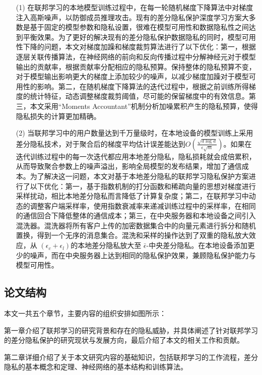 \begin{enumerate}
\item [(1)]在联邦学习的本地模型训练过程中，在每一轮随机梯度下降算法中对梯度注入高斯噪声，以防御成员推理攻击。现有的差分隐私保护深度学习方案大多数是基于固定的模型参数和隐私设置，很难在模型可用性和数据隐私性之间达到平衡效果。为了更好的解决现有的差分隐私保护数据隐私的同时，模型可用性下降的问题，本文对梯度加躁和梯度裁剪算法进行了以下优化：第一，根据逐层关联传播算法，在神经网络的前向和反向传播过程中分解神经元对于模型输出的贡献率，根据贡献率分配相应的隐私预算。保持整体的隐私预算不变，对于模型输出影响更大的梯度上添加较少的噪声，以减少梯度加躁对于模型可用性的影响。第二，在随机梯度下降算法的迭代过程中，根据之前训练所得梯度的统计特征，动态调整梯度裁剪阈值，尽可能的保留梯度中的有效信息。第三，本文采用“Moments Accountant”机制分析加噪累积产生的隐私预算，使得隐私损失的计算更加精确。

\item [(2)]当联邦学习中的用户数量达到千万量级时，在本地设备的模型训练上采用差分隐私技术，对于聚合后的梯度平均估计误差能达到$O\left(\frac{\sqrt{d \log d}}{\epsilon \sqrt{m}}\right)$。如果在迭代训练过程中的每一次迭代都应用本地差分隐私，隐私损耗就会成倍累积，从而导致聚合参数上的噪声溢出，影响全局模型的发布结果，增加了通信成本。为了解决这一问题，本文对基于本地差分隐私的联邦学习隐私保护方案进行了以下优化：第一，基于指数机制的打分函数和稀疏向量的思想对梯度进行采样扰动，相比本地差分隐私而言降低了计算复杂度；第二，在联邦学习中动态的调整客户端采样率，使用指数衰减率来递减训练过程中的采样率，在相同的通信回合下降低整体的通信成本；第三，在中央服务器和本地设备之间引入混洗器。混洗器将所有客户上传的加密数据集合中的向量元素进行拆分和随机置换，得到一个无序的消息集合。混洗和采样的操作达到了双重的隐私放大效应，从 $\left(\epsilon_{c}+\epsilon_{l}\right)$的本地差分隐私放大至 $\bar{\epsilon} $-中央差分隐私。在本地设备添加更少的噪声，而在中央服务器上达到相同的隐私保护效果，兼顾隐私保护能力与模型可用性。

\end{enumerate}

\subsection{论文结构}
本文一共五个章节，主要内容的组织安排如图所示：

第一章介绍了联邦学习的研究背景和存在的隐私威胁，并具体阐述了针对联邦学习的差分隐私保护的研究现状与发展方向，最后介绍了本文的相关工作和贡献。

第二章详细介绍了关于本文研究内容的基础知识，包括联邦学习的工作流程，差分隐私的基本概念和定理、神经网络的基本结构和训练算法。

